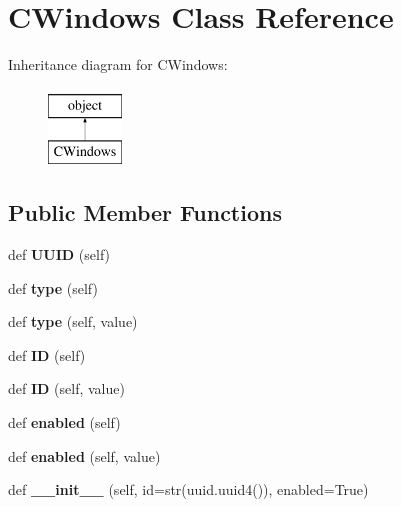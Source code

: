 \hypertarget{class_c_windows_1_1_c_windows}{}\section{C\+Windows Class Reference}
\label{class_c_windows_1_1_c_windows}
Inheritance diagram for C\+Windows\+:\begin{figure}[H]
\begin{center}
\leavevmode
\includegraphics[height=2.000000cm]{class_c_windows_1_1_c_windows}
\end{center}
\end{figure}
\subsection*{Public Member Functions}
\begin{DoxyCompactItemize}
\item 
\mbox{\label{class_c_windows_1_1_c_windows_abbcfc1a774079da020e49c42cbadb693}} 
def {\bfseries U\+U\+ID} (self)
\item 
\mbox{\label{class_c_windows_1_1_c_windows_aff464267544e4efc9b770c8320c8f199}} 
def {\bfseries type} (self)
\item 
\mbox{\label{class_c_windows_1_1_c_windows_aca033702f187894894d3102de41d6b99}} 
def {\bfseries type} (self, value)
\item 
\mbox{\label{class_c_windows_1_1_c_windows_adb8818239148d2e5c5833a2b062ee9ad}} 
def {\bfseries ID} (self)
\item 
\mbox{\label{class_c_windows_1_1_c_windows_a0a178fbcae3f6431733dd63ee37ac7bb}} 
def {\bfseries ID} (self, value)
\item 
\mbox{\label{class_c_windows_1_1_c_windows_a05cd4cd28b324f262fefe1a1782bd992}} 
def {\bfseries enabled} (self)
\item 
\mbox{\label{class_c_windows_1_1_c_windows_a18495e0c3f2639c84751c9aa77cd03b3}} 
def {\bfseries enabled} (self, value)
\item 
\mbox{\label{class_c_windows_1_1_c_windows_a71963b9940a29bf3f2c10546c2cb9b50}} 
def {\bfseries \+\_\+\+\_\+init\+\_\+\+\_\+} (self, id=str(uuid.\+uuid4()), enabled=True)
\end{DoxyCompactItemize}


